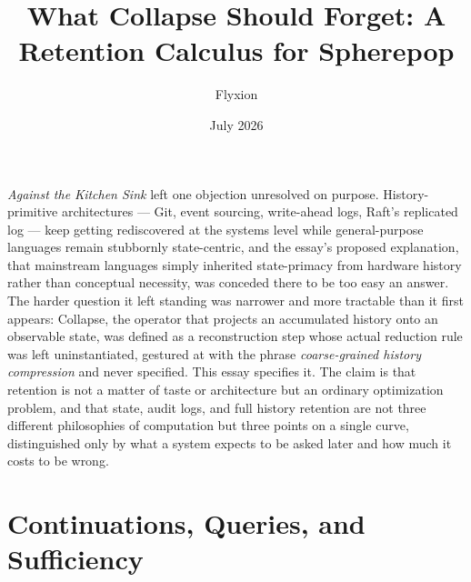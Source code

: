 \documentclass[11pt]{article}
\title{What Collapse Should Forget: A Retention Calculus for Spherepop}
\author{Flyxion}
\date{July 2026}
\begin{document}
\maketitle

\emph{Against the Kitchen Sink} left one objection unresolved on purpose. History-primitive architectures --- Git, event sourcing, write-ahead logs, Raft's replicated log --- keep getting rediscovered at the systems level while general-purpose languages remain stubbornly state-centric, and the essay's proposed explanation, that mainstream languages simply inherited state-primacy from hardware history rather than conceptual necessity, was conceded there to be too easy an answer. The harder question it left standing was narrower and more tractable than it first appears: Collapse, the operator that projects an accumulated history onto an observable state, was defined as a reconstruction step whose actual reduction rule was left uninstantiated, gestured at with the phrase \emph{coarse-grained history compression} and never specified. This essay specifies it. The claim is that retention is not a matter of taste or architecture but an ordinary optimization problem, and that state, audit logs, and full history retention are not three different philosophies of computation but three points on a single curve, distinguished only by what a system expects to be asked later and how much it costs to be wrong.

\section{Continuations, Queries, and Sufficiency}
\end{document}
